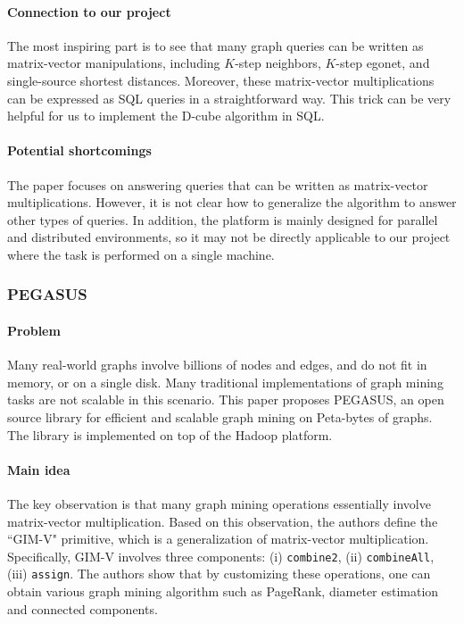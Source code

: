 \paragraph{Connection to our project} The most inspiring part is to see that many graph queries can be written as matrix-vector manipulations, including $K$-step neighbors, $K$-step egonet, and single-source shortest distances. Moreover, these matrix-vector multiplications can be expressed as SQL queries in a straightforward way. This trick can be very helpful for us to implement the D-cube algorithm in SQL. 

\paragraph{Potential shortcomings} The paper focuses on answering queries that can be written as matrix-vector multiplications.  However, it is not clear how to generalize the algorithm to answer other types of queries. In addition, the platform is mainly designed for parallel and distributed environments, so it may not be directly applicable to our project where the task is performed on a single machine. 


\subsubsection{PEGASUS \cite{kang2009pegasus:}}

\paragraph{Problem} Many real-world graphs involve billions of nodes and edges, and do not fit in memory, or on a single disk. Many traditional implementations of graph mining tasks are not scalable in this scenario.  This paper proposes PEGASUS,  an open source library for efficient and scalable graph mining on Peta-bytes of graphs. The library is implemented on top of the Hadoop platform. 

\paragraph{Main idea} The key observation is that many graph mining operations essentially involve matrix-vector multiplication. Based on this observation, the authors define the ``GIM-V" primitive, which is a generalization of matrix-vector multiplication. Specifically, GIM-V involves three components: (i) {\tt combine2}, (ii) {\tt combineAll}, (iii) {\tt assign}. The authors show that by customizing these operations, one can obtain various graph mining algorithm such as PageRank, diameter estimation and connected components. 


